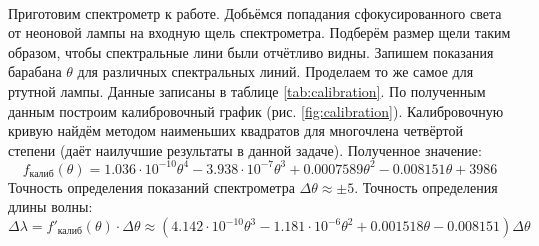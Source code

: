 \documentclass[a4paper,12pt]{article} %
\begin{document}
\paragraph{} Приготовим спектрометр к работе. Добьёмся попадания сфокусированного света от неоновой лампы на входную щель спектрометра. Подберём размер щели таким образом, чтобы спектральные лини были отчётливо видны. Запишем показания барабана $\theta$ для различных спектральных линий. Проделаем то же самое для ртутной лампы. Данные записаны в таблице \ref{tab:calibration}. По полученным данным построим калибровочный график (рис. \ref{fig:calibration}). Калибровочную кривую найдём методом наименьших квадратов для многочлена четвёртой степени (даёт наилучшие результаты в данной задаче). Полученное значение:
\begin{equation}
f_\text{калиб}(\theta) = 1.036 \cdot 10^{-10} \theta^4 - 3.938 \cdot 10^{-7} \theta^3 + 0.0007589 \theta ^ 2 - 0.008151 \theta + 3986
\label{e:calibration}
\end{equation}
\noindent Точность определения показаний спектрометра $\Delta \theta \approx \pm 5$.  Точность определения длины волны:
\begin{equation}
\Delta \lambda = f'_\text{калиб}(\theta) \cdot \Delta \theta \approx (4.142 \cdot 10^{-10} \theta^3 - 1.181 \cdot 10^{-6} \theta^2 + 0.001518 \theta - 0.008151)\Delta \theta
\label{e:error}
\end{equation}
\end{document}
